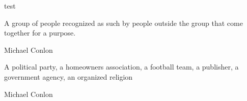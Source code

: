 \documentclass[letterpaper,10pt,english]{sphinxmanual}
\begin{document}
\begin{sphinxShadowBox}

\sphinxAtStartPar
test
\end{sphinxShadowBox}

\begin{sphinxShadowBox}

\sphinxAtStartPar
{\hyperref[\detokenize{doc-BFO_0000031::doc}]{}}
\end{sphinxShadowBox}

\begin{sphinxShadowBox}

\sphinxAtStartPar
A group of people recognized as such by people outside the group that come together for a purpose.
\end{sphinxShadowBox}

\begin{sphinxShadowBox}

\sphinxAtStartPar
Michael Conlon 
\end{sphinxShadowBox}

\begin{sphinxShadowBox}

\sphinxAtStartPar
A political party, a homeowners association, a football team, a publisher, a government agency, an organized religion
\end{sphinxShadowBox}

\begin{sphinxShadowBox}

\sphinxAtStartPar
{}
\end{sphinxShadowBox}

\begin{sphinxShadowBox}

\sphinxAtStartPar
Michael Conlon 
\end{sphinxShadowBox}
\end{document}
